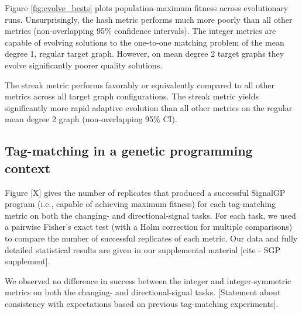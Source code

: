

Figure \ref{fig:evolve_bests} plots population-maximum fitness across evolutionary runs.
Unsurprisingly, the hash metric performs much more poorly than all other metrics (non-overlapping 95\% confidence intervals).
The integer metrics are capable of evolving solutions to the one-to-one matching problem of the mean degree 1, regular target graph.
However, on mean degree 2 target graphs they evolve significantly poorer quality solutions.

The streak metric performs favorably or equivalently compared to all other metrics across all target graph configurations.
The streak metric yields significantly more rapid adaptive evolution than all other metrics on the regular mean degree 2 graph (non-overlapping 95\% CI).

\subsection{Tag-matching in a genetic programming context}



Figure [X] gives the number of replicates that produced a successful SignalGP program (i.e., capable of achieving maximum fitness) for each tag-matching metric on both the changing- and directional-signal tasks.
For each task, we used a pairwise Fisher's exact test (with a Holm correction for multiple comparisons) to compare the number of successful replicates of each metric.
Our data and fully detailed statistical results are given in our supplemental material [cite - SGP supplement].

We observed no difference in success between the integer and integer-symmetric metrics on both the changing- and directional-signal tasks.
[Statement about consistency with expectations based on previous tag-matching experiments].

